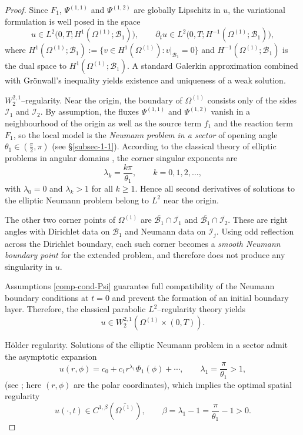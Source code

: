 \documentclass[reqno]{amsart}            %
\numberwithin{equation}{section}
\begin{document}
	\begin{proof}
		Since $F_1$, $\Psi^{(1,1)}$ and $\Psi^{(1,2)}$ are globally Lipschitz in $u$, 
		the variational formulation is well posed in the space
		\[
		u\in L^2\big(0,T; H^1(\Omega^{(1)};\mathcal{B}_1)\big),
		\qquad 
		\partial_t u\in L^2\big(0,T; H^{-1}(\Omega^{(1)};\mathcal{B}_1)\big),
		\]
		where $H^1(\Omega^{(1)};\mathcal{B}_1) := \{v\in H^1(\Omega^{(1)}): v|_{\mathcal{B}_1}=0\}$ and $H^{-1}(\Omega^{(1)};\mathcal{B}_1)$ is the dual space to $H^1(\Omega^{(1)};\mathcal{B}_1).$
		A standard Galerkin approximation combined with Grönwall’s inequality yields existence and uniqueness of a weak solution.
		
		\smallskip
		\noindent\textsf{$W^{2,1}_2$--regularity.}
		Near the origin, the boundary of $\Omega^{(1)}$ consists only of the sides 
		$\mathcal I_1$ and $\mathcal I_2$.  
		By assumption, the fluxes $\Psi^{(1,1)}$ and $\Psi^{(1,2)}$ vanish in a neighbourhood 
		of the origin as well as the source term $f_1$ and the reaction term
		$F_1$, so the local model is the \emph{Neumann problem in a sector} of opening 
		angle $\theta_1\in(\frac{\pi}{2},\pi)$ (see \S\ref{subsec-1-1}).  
		According to the classical theory of elliptic problems in angular domains 
		\cite{Kondratev1967,Grisvard1985,Dauge1988,Maz-Naz-Pla-2012}, the corner singular 
		exponents are
		\[
		\lambda_k=\frac{k\pi}{\theta_1},\qquad k=0,1,2,\dots,
		\]
		with $\lambda_0=0$ and $\lambda_k>1$ for all $k\ge1$.  
		Hence all second derivatives of solutions to the elliptic Neumann problem belong to 
		$L^2$ near the origin.
		
		The other two corner points of $\Omega^{(1)}$ are 
		$\overline{\mathcal{B}_1}\cap\overline{\mathcal{I}_1}$ and 
		$\overline{\mathcal{B}_1}\cap\overline{\mathcal{I}_2}$.  
		These are right angles with Dirichlet data on $\mathcal{B}_1$ and Neumann data on 
		$\mathcal{I}_j$.  
		Using odd reflection across the Dirichlet boundary, each such corner becomes a 
		\emph{smooth Neumann boundary point} for the extended problem, and therefore does not 
		produce any singularity in $u$.
		
		Assumptions \eqref{comp-cond-Psi} guarantee full compatibility of the Neumann boundary 
		conditions at $t=0$ and prevent the formation of an initial boundary layer.  
		Therefore, the classical parabolic $L^2$--regularity theory 
		\cite{LSU,Lions-Magenes} yields
		\[
		u\in W^{2,1}_2(\Omega^{(1)}\times(0,T)).
		\]
		
		\smallskip
		\noindent\textsf{Hölder regularity.}
		Solutions of the elliptic Neumann problem in a sector admit the asymptotic expansion
		\begin{equation}\label{asym-in-coner}
			u(r,\phi)=c_0 + c_1 r^{\lambda_1}\varPhi_1(\phi) + \cdots,
			\qquad \lambda_1=\frac{\pi}{\theta_1}>1,
		\end{equation}
		(see \cite{Kondratev1967,Grisvard1985,Dauge1988,Maz-Naz-Pla-2012}; here $(r,\phi)$ are the polar coordinates),  which implies the optimal spatial regularity
		\[
		u(\cdot,t)\in C^{1,\beta}(\overline{\Omega^{(1)}}),
		\qquad 
		\beta=\lambda_1-1=\frac{\pi}{\theta_1}-1>0.
		\]
		

\end{proof}
\end{document}
